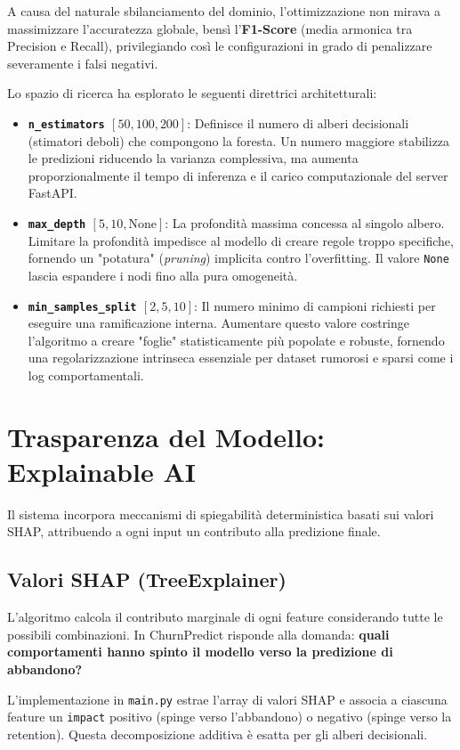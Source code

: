 \documentclass[11pt,a4paper]{article}
\begin{document}
A causa del naturale sbilanciamento del dominio, l'ottimizzazione non mirava a massimizzare l'accuratezza globale, bensì l'\textbf{F1-Score} (media armonica tra Precision e Recall), privilegiando così le configurazioni in grado di penalizzare severamente i falsi negativi. 

Lo spazio di ricerca ha esplorato le seguenti direttrici architetturali:
\begin{itemize}
    \item \textbf{\texttt{n\_estimators} $[50, 100, 200]$}: Definisce il numero di alberi decisionali (stimatori deboli) che compongono la foresta. Un numero maggiore stabilizza le predizioni riducendo la varianza complessiva, ma aumenta proporzionalmente il tempo di inferenza e il carico computazionale del server FastAPI.
    \item \textbf{\texttt{max\_depth} $[5, 10, \text{None}]$}: La profondità massima concessa al singolo albero. Limitare la profondità impedisce al modello di creare regole troppo specifiche, fornendo un "potatura" (\textit{pruning}) implicita contro l'overfitting. Il valore \texttt{None} lascia espandere i nodi fino alla pura omogeneità.
    \item \textbf{\texttt{min\_samples\_split} $[2, 5, 10]$}: Il numero minimo di campioni richiesti per eseguire una ramificazione interna. Aumentare questo valore costringe l'algoritmo a creare "foglie" statisticamente più popolate e robuste, fornendo una regolarizzazione intrinseca essenziale per dataset rumorosi e sparsi come i log comportamentali.
\end{itemize}

\section{Trasparenza del Modello: Explainable AI}
Il sistema incorpora meccanismi di spiegabilità deterministica basati sui valori SHAP, attribuendo a ogni input un contributo alla predizione finale.

\subsection{Valori SHAP (TreeExplainer)}
L'algoritmo calcola il contributo marginale di ogni feature considerando tutte le possibili combinazioni. In ChurnPredict risponde alla domanda: \textbf{quali comportamenti hanno spinto il modello verso la predizione di abbandono?} 

L'implementazione in \texttt{main.py} estrae l'array di valori SHAP e associa a ciascuna feature un \texttt{impact} positivo (spinge verso l'abbandono) o negativo (spinge verso la retention). Questa decomposizione additiva è esatta per gli alberi decisionali.
\end{document}
